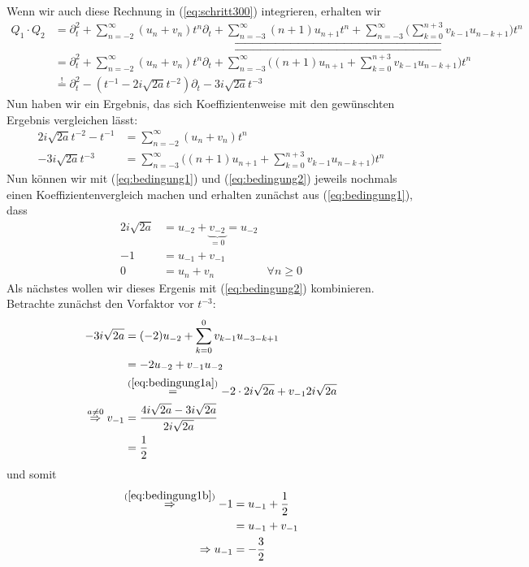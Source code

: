 Wenn wir auch diese Rechnung in (\ref{eq:schritt300}) integrieren, erhalten wir
\begin{equation} \label{eq:schritt300}
  \begin{aligned}
Q_1\cdot Q_2&=\partial_t^2 + \sum_{n=-2}^\infty (u_n+v_n)t^n \partial_t
  + \underbracket{\sum_{n=-3}^\infty (n+1)u_{n+1}t^{n}
  + \sum_{n=-3}^\infty \Big( \sum_{k=0}^{n+3} v_{k-1}u_{n-k+1} \Big) t^{n}}
\\&=\partial_t^2 + \sum_{n=-2}^\infty (u_n+v_n)t^n \partial_t
  + \overbracket{\sum_{n=-3}^\infty
  \Big( (n+1)u_{n+1} + \sum_{k=0}^{n+3} v_{k-1}u_{n-k+1} \Big) t^{n}}
\\&\overset{!}{=} \partial_t^2 - (t^{-1} - 2i\sqrt{2a}t^{-2})\partial_t
  - 3 i\sqrt{2a}t^{-3}
  \end{aligned}
\end{equation}
Nun haben wir ein Ergebnis, das sich Koeffizientenweise mit den gewünschten
Ergebnis vergleichen lässt:
\begin{align}
\label{eq:bedingung1}
2i\sqrt{2a}t^{-2} - t^{-1} &= \sum_{n=-2}^\infty (u_n+v_n)t^n
\\
\label{eq:bedingung2}
- 3 i\sqrt{2a}t^{-3} &= \sum_{n=-3}^\infty
  \Big( (n+1)u_{n+1} + \sum_{k=0}^{n+3} v_{k-1}u_{n-k+1} \Big) t^{n}
\end{align}
Nun können wir mit (\ref{eq:bedingung1}) und (\ref{eq:bedingung2}) jeweils
nochmals einen Koeffizientenvergleich machen und erhalten zunächst aus
(\ref{eq:bedingung1}), dass
\begin{align}
2i\sqrt{2a} &= u_{-2} + \underset{=0}{\underbrace{v_{-2}}} = u_{-2}
\label{eq:bedingung1a}
\\-1 &= u_{-1} + v_{-1}
\label{eq:bedingung1b}
\\0 &= u_n + v_n & \forall n \geq 0
\label{eq:bedingung1c}
\end{align}
Als nächstes wollen wir dieses Ergenis mit (\ref{eq:bedingung2}) kombinieren.
Betrachte zunächst den Vorfaktor vor $t^{-3}$:
\begin{align*}
- 3 i\sqrt{2a} &= (-2)u_{-2} + \sum_{k=0}^{0} v_{k-1}u_{-3-k+1}
\\&= -2u_{-2} + v_{-1}u_{-2}
\\&\overset{(\ref{eq:bedingung1a})}{=} -2\cdot2i\sqrt{2a} + v_{-1}2i\sqrt{2a}
\\\overset{a\neq0}{\Rightarrow} v_{-1}
  &= \frac{4i\sqrt{2a}-3i\sqrt{2a}}{2i\sqrt{2a}}
\\&= \frac{1}{2}
\end{align*}
und somit
\begin{align*}
\overset{(\ref{eq:bedingung1b})}{\Rightarrow} -1&=u_{-1}+\frac{1}{2}
\\&=u_{-1}+v_{-1}
\\\Rightarrow u_{-1}&=-\frac{3}{2}
\end{align*}
